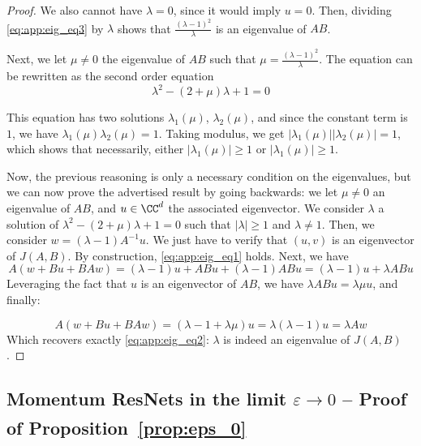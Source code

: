 \documentclass{article}
\begin{document}
\begin{proof}
We also cannot have $\lambda =0$, since it would imply $u=0$.
Then, dividing \eqref{eq:app:eig_eq3} by $\lambda$ shows that $\frac{(\lambda - 1)^2}{\lambda}$ is an eigenvalue of $AB$.

Next, we let $\mu\neq 0$ the eigenvalue of $AB$ such that $\mu = \frac{(\lambda - 1)^2}{\lambda}$.
The equation can be rewritten as the second order equation 
$$
\lambda^2 -(2 +\mu)\lambda + 1 = 0
$$

This equation has two solutions $\lambda_1(\mu)$, $\lambda_2(\mu)$, and since the constant term is $1$, we have $\lambda_1(\mu)\lambda_2(\mu) = 1$. Taking modulus, we get 
$|\lambda_1(\mu)||\lambda_2(\mu)|= 1$, which shows that necessarily, either $|\lambda_1(\mu)|\geq 1$ or $|\lambda_1(\mu)|\geq 1$.


Now, the previous reasoning is only a necessary condition on the eigenvalues, but we can now prove the advertised result by going backwards: we let $\mu \neq 0$ an eigenvalue of $AB$, and $u\in\CC^d$ the associated eigenvector. We consider $\lambda$ a solution of $\lambda^2 -(2 +\mu)\lambda + 1 = 0$ such that $|\lambda | \geq 1$ and $\lambda \neq 1$. Then, we consider $w = (\lambda - 1)A^{-1}u$. We just have to verify that $(u, v)$ is an eigenvector of $J(A, B)$. By construction, \eqref{eq:app:eig_eq1} holds.
Next, we have 
$$
A(w + Bu + BAw) = (\lambda - 1)u + ABu + (\lambda -1)ABu=(\lambda - 1) u + \lambda ABu
$$
Leveraging the fact that $u$ is an eigenvector of $AB$, we have $\lambda ABu = \lambda \mu u$, and finally:

$$
A(w + Bu + BAw) = (\lambda - 1 + \lambda \mu)u = \lambda (\lambda-1)u = \lambda Aw
$$
Which recovers exactly \eqref{eq:app:eig_eq2}: $\lambda$ is indeed an eigenvalue of $J(A, B)$.
\end{proof}


\subsection{Momentum ResNets in the limit $\varepsilon \xrightarrow[]{} 0$ -- Proof of Proposition~\ref{prop:eps_0}}\label{app:prop_eps_0}
\end{document}
